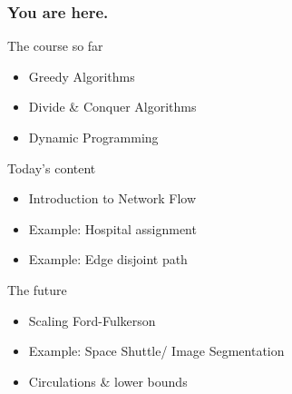 \begin{frame}
	\frametitle{You are here.}
	\begin{block}{The course so far}
		\begin{itemize}
			\item Greedy Algorithms
			\item Divide \& Conquer Algorithms
			\item Dynamic Programming
		\end{itemize}
	\end{block}
	\pause
	\begin{exampleblock}{Today's content}
		\begin{itemize}
			\item Introduction to Network Flow
			\item Example: Hospital assignment
			\item Example: Edge disjoint path
		\end{itemize}
	\end{exampleblock}
	\pause
	\begin{block}{The future}
		\begin{itemize}
			\item Scaling Ford-Fulkerson
			\item Example: Space Shuttle/ Image Segmentation
			\item Circulations \& lower bounds
		\end{itemize}
	\end{block}
\end{frame}

